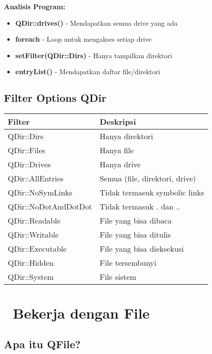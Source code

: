 \textbf{Analisis Program:}
\begin{itemize}
\item \textbf{QDir::drives()} - Mendapatkan semua drive yang ada
\item \textbf{foreach} - Loop untuk mengakses setiap drive
\item \textbf{setFilter(QDir::Dirs)} - Hanya tampilkan direktori
\item \textbf{entryList()} - Mendapatkan daftar file/direktori
\end{itemize}

\subsection{Filter Options QDir}

\begin{center}
\begin{tabular}{|l|l|}
\hline
\textbf{Filter} & \textbf{Deskripsi} \\
\hline
QDir::Dirs & Hanya direktori \\
\hline
QDir::Files & Hanya file \\
\hline
QDir::Drives & Hanya drive \\
\hline
QDir::AllEntries & Semua (file, direktori, drive) \\
\hline
QDir::NoSymLinks & Tidak termasuk symbolic links \\
\hline
QDir::NoDotAndDotDot & Tidak termasuk . dan .. \\
\hline
QDir::Readable & File yang bisa dibaca \\
\hline
QDir::Writable & File yang bisa ditulis \\
\hline
QDir::Executable & File yang bisa dieksekusi \\
\hline
QDir::Hidden & File tersembunyi \\
\hline
QDir::System & File sistem \\
\hline
\end{tabular}
\end{center}

\section{📄 Bekerja dengan File}

\subsection{Apa itu QFile?}

